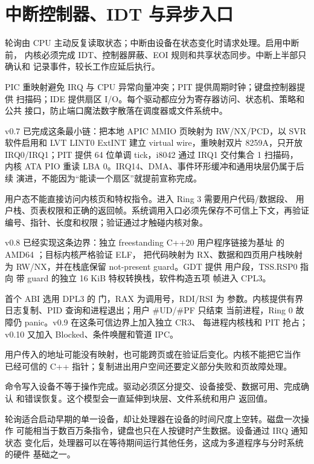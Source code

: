 \section{中断控制器、IDT 与异步入口}

轮询由 CPU 主动反复读取状态；中断由设备在状态变化时请求处理。启用中断前，
内核必须完成 IDT、控制器屏蔽、EOI 规则和共享状态同步。中断上半部只确认和
记录事件，较长工作应延后执行。

PIC 重映射避免 IRQ 与 CPU 异常向量冲突；PIT 提供周期时钟；键盘控制器提供
扫描码；IDE 提供扇区 I/O。每个驱动都应分为寄存器访问、状态机、策略和公共
接口，防止端口魔法数字散落在调度器或文件系统中。

v0.7 已完成这条最小链：把本地 APIC MMIO 页映射为 RW/NX/PCD，以 SVR
软件启用和 LVT LINT0 ExtINT 建立 virtual wire，重映射双片 8259A，只开放
IRQ0/IRQ1；PIT 提供 64 位单调 tick，i8042 通过 IRQ1 交付集合 1 扫描码，
内核 ATA PIO 重读 LBA 0。IRQ14、DMA、事件环形缓冲和通用块层仍属于后续
演进，不能因为“能读一个扇区”就提前宣称完成。

用户态不能直接访问内核页和特权指令。进入 Ring 3 需要用户代码/数据段、
用户栈、页表权限和正确的返回帧。系统调用入口必须先保存不可信上下文，再验证
编号、指针、长度和权限；验证通过才触碰内核对象。

v0.8 已经实现这条边界：独立 freestanding C++20 用户程序链接为基址
 的 AMD64 ；目标内核严格验证 ELF，
把代码映射为 RX、数据和四页用户栈映射为 RW/NX，并在栈底保留
not-present guard。GDT 提供  用户段，TSS.RSP0 指向
带 guard 的独立 16 KiB 特权转换栈，软件构造五项  帧进入
CPL3。

首个 ABI 选用 DPL3 的  门，RAX 为调用号，RDI/RSI 为
参数。内核提供有界日志复制、PID 查询和进程退出；用户 \#UD/\#PF 只结束
当前进程，Ring 0 故障仍 panic。v0.9 在这条可信边界上加入独立 CR3、
每进程内核栈和 PIT 抢占；v0.10 又加入 Blocked、条件唤醒和管道 IPC。

\begin{contractbox}
用户传入的地址可能没有映射，也可能跨页或在验证后变化。内核不能把它当作
已经可信的 C++ 指针；复制进出用户空间还要定义部分失败和页故障处理。
\end{contractbox}

命令写入设备不等于操作完成。驱动必须区分提交、设备接受、数据可用、完成确认
和错误恢复。这个模型会一直延伸到块层、文件系统和用户  返回值。

轮询适合启动早期的单一设备，却让处理器在设备的时间尺度上空转。磁盘一次操作
可能相当于数百万条指令，键盘也只在人按键时产生数据。设备通过 IRQ 通知状态
变化后，处理器可以在等待期间运行其他任务，这成为多道程序与分时系统的硬件
基础之一。

